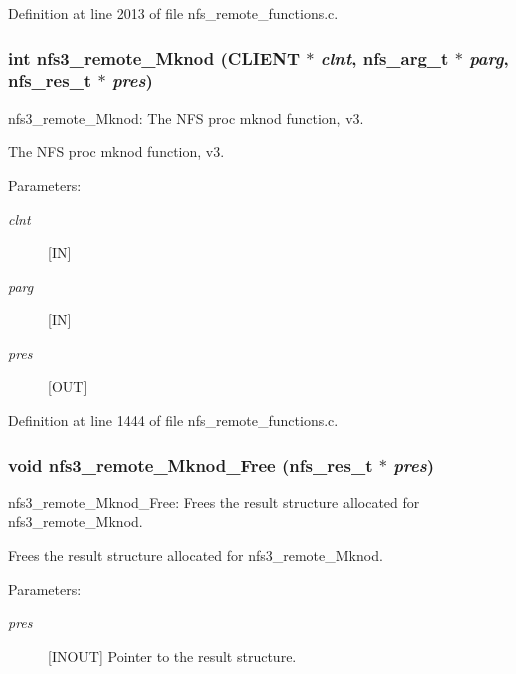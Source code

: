Definition at line 2013 of file nfs\_\-remote\_\-functions.c.
\subsubsection[{nfs3\_\-remote\_\-Mknod}]{\setlength{\rightskip}{0pt plus 5cm}int nfs3\_\-remote\_\-Mknod (CLIENT $\ast$ {\em clnt}, \/  nfs\_\-arg\_\-t $\ast$ {\em parg}, \/  nfs\_\-res\_\-t $\ast$ {\em pres})}\label{group__NFSprocs_g39ac31f6265cf508006d1def33d06c70}


nfs3\_\-remote\_\-Mknod: The NFS proc mknod function, v3.

The NFS proc mknod function, v3.

\begin{Desc}
\item[Parameters:]
\begin{description}
\item[{\em clnt}][IN] \item[{\em parg}][IN] \item[{\em pres}][OUT] \end{description}
\end{Desc}


Definition at line 1444 of file nfs\_\-remote\_\-functions.c.
\subsubsection[{nfs3\_\-remote\_\-Mknod\_\-Free}]{\setlength{\rightskip}{0pt plus 5cm}void nfs3\_\-remote\_\-Mknod\_\-Free (nfs\_\-res\_\-t $\ast$ {\em pres})}\label{group__NFSprocs_gc9750449bc4e535e495d041292d150ad}


nfs3\_\-remote\_\-Mknod\_\-Free: Frees the result structure allocated for nfs3\_\-remote\_\-Mknod.

Frees the result structure allocated for nfs3\_\-remote\_\-Mknod.

\begin{Desc}
\item[Parameters:]
\begin{description}
\item[{\em pres}][INOUT] Pointer to the result structure. \end{description}
\end{Desc}


